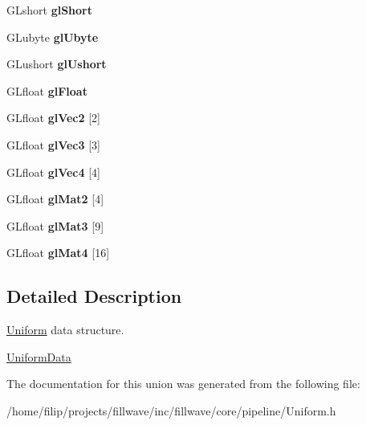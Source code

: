 \begin{DoxyCompactItemize}
\mbox{\label{unionflw_1_1flc_1_1UniformData_a686d74a9fc01a6c032c6f94690594b73}} 
G\+Lshort {\bfseries gl\+Short}
\item 
\mbox{\label{unionflw_1_1flc_1_1UniformData_a5b9beb37401159aebdf49c382a79de0f}} 
G\+Lubyte {\bfseries gl\+Ubyte}
\item 
\mbox{\label{unionflw_1_1flc_1_1UniformData_a26396dea273734c5d8169abf0e8dab53}} 
G\+Lushort {\bfseries gl\+Ushort}
\item 
\mbox{\label{unionflw_1_1flc_1_1UniformData_a739c79d2aaa266d3387bd593cc4d2ec2}} 
G\+Lfloat {\bfseries gl\+Float}
\item 
\mbox{\label{unionflw_1_1flc_1_1UniformData_a9ace67c1f4433c6a80dee263a0b980ab}} 
G\+Lfloat {\bfseries gl\+Vec2} \mbox{[}2\mbox{]}
\item 
\mbox{\label{unionflw_1_1flc_1_1UniformData_a85d0a056eb699ea8bde140056b5457ec}} 
G\+Lfloat {\bfseries gl\+Vec3} \mbox{[}3\mbox{]}
\item 
\mbox{\label{unionflw_1_1flc_1_1UniformData_a87d376201ff4248ddbf217b6e284ee10}} 
G\+Lfloat {\bfseries gl\+Vec4} \mbox{[}4\mbox{]}
\item 
\mbox{\label{unionflw_1_1flc_1_1UniformData_af9ab3d147cb8dfd721da778a2a1a21ce}} 
G\+Lfloat {\bfseries gl\+Mat2} \mbox{[}4\mbox{]}
\item 
\mbox{\label{unionflw_1_1flc_1_1UniformData_a58027671b26a513e089246174b3f2822}} 
G\+Lfloat {\bfseries gl\+Mat3} \mbox{[}9\mbox{]}
\item 
\mbox{\label{unionflw_1_1flc_1_1UniformData_abb8eb2ed69307549402fb79269899abd}} 
G\+Lfloat {\bfseries gl\+Mat4} \mbox{[}16\mbox{]}
\end{DoxyCompactItemize}


\subsection{Detailed Description}
\hyperlink{classflw_1_1flc_1_1Uniform}{Uniform} data structure. 

\hyperlink{unionflw_1_1flc_1_1UniformData}{Uniform\+Data} 

The documentation for this union was generated from the following file\+:\begin{DoxyCompactItemize}
\item 
/home/filip/projects/fillwave/inc/fillwave/core/pipeline/Uniform.\+h\end{DoxyCompactItemize}
